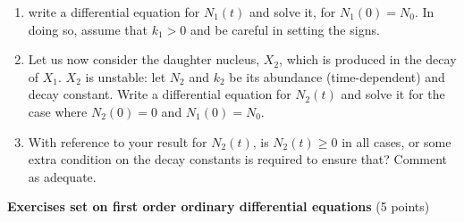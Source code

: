 \documentclass[fleqn]{article}
\begin{document}
\begin{enumerate}
\begin{enumerate}
    \item  write a differential equation for $N_1(t)$ and solve it, for $N_1(0)=N_0$.  In doing so, assume that $k_1>0$ and be careful in setting the signs. 
  
    \item Let us now consider the daughter nucleus, $X_2$, which is produced in the decay of $X_1$. $X_2$ is unstable: let $N_2$ and $k_2$ be its abundance (time-dependent) and decay constant.  Write a differential equation for $N_2(t)$ and solve it for the case where $N_2(0)=0$ and $N_1(0)=N_0$.
  
      \item With reference to your result for $N_2(t)$, is $N_2(t)\geq 0$ in all cases, or some extra condition on the decay constants is required to ensure that?  Comment as adequate.   
      
      \end{enumerate}
  
  \end{enumerate}

  \pagebreak

  \textbf{Exercises set on first order ordinary differential equations} (5 points)
\end{document}
